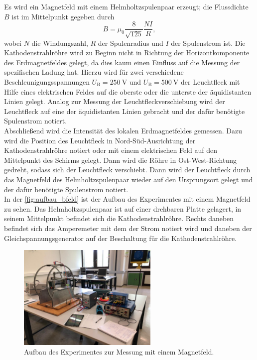     Es wird ein Magnetfeld mit einem Helmholtzspulenpaar erzeugt; die Flussdichte $B$ ist im Mittelpunkt gegeben durch 
    \begin{equation} \label{eqn:B}
        B = \mu_0 \frac{8}{\sqrt{125}} \frac{N I}{R},
    \end{equation}
    wobei $N$ die Windungszahl, $R$ der Spulenradius und $I$ der Spulenstrom ist. Die Kathodenstrahlröhre wird zu Beginn nicht in Richtung der Horizontkomponente
    des Erdmagnetfeldes gelegt, da dies kaum einen Einfluss auf die Messung der spezifischen Ladung hat. Hierzu wird für zwei verschiedene Beschleunigungsspannungen 
    $U_{\text{B}} = \SI{250}{\volt}$ und $U_{\text{B}} = \SI{500}{\volt}$ der Leuchtfleck mit Hilfe eines elektrischen Feldes auf die oberste oder die unterste der
    äquidistanten Linien gelegt. Analog zur Messung der Leuchtfleckverschiebung wird der Leuchtfleck auf eine der äquidistanten Linien gebracht und der dafür benötigte
    Spulenstrom notiert. \\

    \noindent Abschließend wird die Intensität des lokalen Erdmagnetfeldes gemessen. Dazu wird die Position des Leuchtfleck in Nord-Süd-Ausrichtung der 
    Kathodenstrahlröhre notiert oder mit einem elektrischen Feld auf den Mittelpunkt des Schirms gelegt. Dann wird die Röhre in Ost-West-Richtung gedreht, sodass
    sich der Leuchtfleck verschiebt. Dann wird der Leuchtfleck durch das Magnetfeld des Helmholtzspulenpaar wieder auf den Ursprungsort gelegt und der 
    dafür benötigte Spulenstrom notiert. \\

    \noindent In der \autoref{fig:aufbau_bfeld} ist der Aufbau des Experimentes mit einem Magnetfeld zu sehen. Das Helmholtzspulenpaar ist auf einer drehbaren
    Platte gelagert, in seinem Mittelpunkt befindet sich die Kathodenstrahlröhre. Rechts daneben befindet sich das Amperemeter mit dem der Strom notiert wird und 
    daneben der Gleichspannungsgenerator auf der Beschaltung für die Kathodenstrahlröhre. 

    \begin{figure}[H]
        \centering
        \includegraphics[width=0.6\textwidth]{bilder/foto_magnet.jpeg}
        \caption{Aufbau des Experimentes zur Messung mit einem Magnetfeld.}
        \label{fig:aufbau_bfeld}
    \end{figure} 


